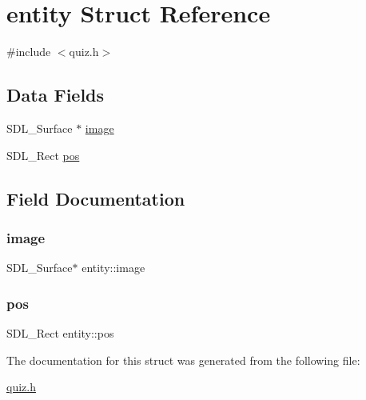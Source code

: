 \hypertarget{structentity}{}\section{entity Struct Reference}
\label{structentity}


{\ttfamily \#include $<$quiz.\+h$>$}

\subsection*{Data Fields}
\begin{DoxyCompactItemize}
\item 
S\+D\+L\+\_\+\+Surface $\ast$ \hyperlink{structentity_a22197c216eb597188b65d419b24abc95}{image}
\item 
S\+D\+L\+\_\+\+Rect \hyperlink{structentity_aa46a7c1001a6a18bca745044952539f7}{pos}
\end{DoxyCompactItemize}


\subsection{Field Documentation}
\mbox{\label{structentity_a22197c216eb597188b65d419b24abc95}} 
\subsubsection{\texorpdfstring{image}{image}}
{\footnotesize\ttfamily S\+D\+L\+\_\+\+Surface$\ast$ entity\+::image}

\mbox{\label{structentity_aa46a7c1001a6a18bca745044952539f7}} 
\subsubsection{\texorpdfstring{pos}{pos}}
{\footnotesize\ttfamily S\+D\+L\+\_\+\+Rect entity\+::pos}



The documentation for this struct was generated from the following file\+:\begin{DoxyCompactItemize}
\item 
\hyperlink{quiz_8h}{quiz.\+h}\end{DoxyCompactItemize}
